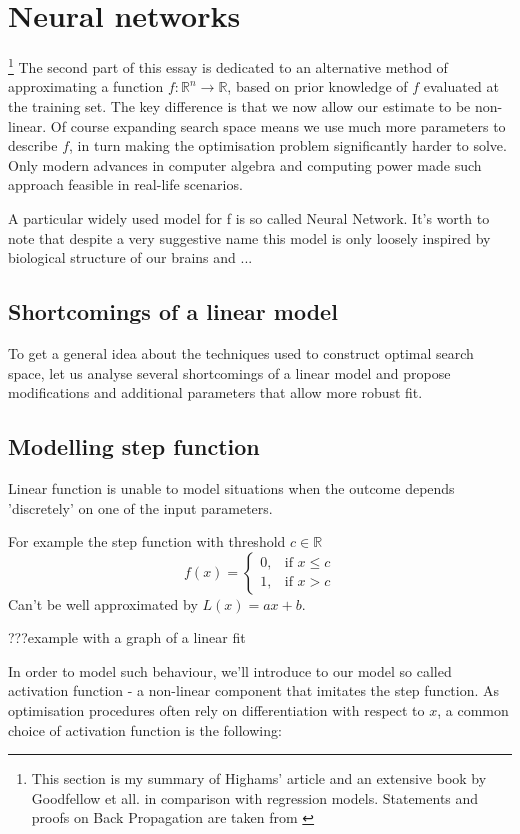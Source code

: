 \documentclass[a4paper]{article}
\theoremstyle{break}
\newcommand{\bib}{???}
\newcommand{\R}{\mathbb{R}}
\begin{document}
\pagebreak

\section{Neural networks}

\footnote{This section is my summary of Highams' article \cite{higham} and an extensive book by Goodfellow et all. \cite{goodfellow} in comparison with regression models. Statements and proofs on Back Propagation are taken from \cite{higham}}
%
The second part of this essay is dedicated to an alternative method of approximating a function $ f : \R^n \to \R$, based on prior knowledge of $f$ evaluated at the training set. The key difference is that we now allow our estimate to be non-linear. Of course expanding search space means we use much more parameters to describe $f$, in turn making the optimisation problem significantly harder to solve. Only modern advances in computer algebra and computing power made such approach feasible in real-life scenarios.

A particular widely used model for f is so called Neural Network. It's worth to note that despite a very suggestive name this model is only loosely inspired by biological structure of our brains and ...

\subsection{Shortcomings of a linear model}
To get a general idea about the techniques used to construct optimal search space, let us analyse several shortcomings of a linear model and propose modifications and additional parameters that allow more robust fit.

\subsection{Modelling step function}
Linear function is unable to model situations when the outcome depends 'discretely' on one of the input parameters.

For example the step function with threshold $c \in \R$
$$ f(x) =
\begin{cases}
    0,& \text{if } x\leq c\\
    1,& \text{if } x > c
\end{cases}$$
Can't be well approximated by $L(x) = a x  + b$.

\bib example with a graph of a linear fit

In order to model such behaviour, we'll introduce to our model so called activation function - a non-linear component  that imitates the step function. As optimisation procedures often rely on differentiation with respect to $x$, a common choice of activation function is the following:
\end{document}
